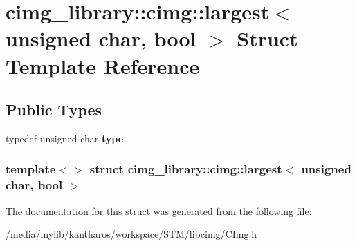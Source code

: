 \hypertarget{structcimg__library_1_1cimg_1_1largest_3_01unsigned_01char_00_01bool_01_4}{
\section{cimg\_\-library::cimg::largest$<$ unsigned char, bool $>$ Struct Template Reference}
\label{structcimg__library_1_1cimg_1_1largest_3_01unsigned_01char_00_01bool_01_4}
}
\subsection*{Public Types}
\begin{DoxyCompactItemize}
\item 
\hypertarget{structcimg__library_1_1cimg_1_1largest_3_01unsigned_01char_00_01bool_01_4_a99c68fb6b98913e2f083ed48ade52d02}{
typedef unsigned char {\bfseries type}}
\label{structcimg__library_1_1cimg_1_1largest_3_01unsigned_01char_00_01bool_01_4_a99c68fb6b98913e2f083ed48ade52d02}

\end{DoxyCompactItemize}
\subsubsection*{template$<$$>$ struct cimg\_\-library::cimg::largest$<$ unsigned char, bool $>$}



The documentation for this struct was generated from the following file:\begin{DoxyCompactItemize}
\item 
/media/mylib/kantharos/workspace/STM/libcimg/CImg.h\end{DoxyCompactItemize}
